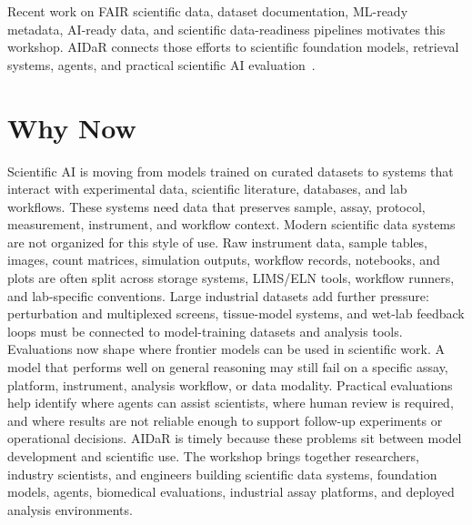 \documentclass[10pt]{article}
\begin{document}
Recent work on FAIR scientific data, dataset documentation, ML-ready metadata, AI-ready data, and scientific data-readiness pipelines motivates this workshop. AIDaR connects those efforts to scientific foundation models, retrieval systems, agents, and practical scientific AI evaluation~\cite{wilkinson2016fair,gebru2021datasheets,pushkarna2022datacards,akhtar2024croissant,brewer2025scientific,brewer2026pipeline,majithia2026actionable,hiniduma2024survey}.

\section{Why Now}
\label{sec:why-now}

Scientific AI is moving from models trained on curated datasets to systems that interact with experimental data, scientific literature, databases, and lab workflows. These systems need data that preserves sample, assay, protocol, measurement, instrument, and workflow context. Modern scientific data systems are not organized for this style of use. Raw instrument data, sample tables, images, count matrices, simulation outputs, workflow records, notebooks, and plots are often split across storage systems, LIMS/ELN tools, workflow runners, and lab-specific conventions. Large industrial datasets add further pressure: perturbation and multiplexed screens, tissue-model systems, and wet-lab feedback loops must be connected to model-training datasets and analysis tools. Evaluations now shape where frontier models can be used in scientific work. A model that performs well on general reasoning may still fail on a specific assay, platform, instrument, analysis workflow, or data modality. Practical evaluations help identify where agents can assist scientists, where human review is required, and where results are not reliable enough to support follow-up experiments or operational decisions. AIDaR is timely because these problems sit between model development and scientific use. The workshop brings together researchers, industry scientists, and engineers building scientific data systems, foundation models, agents, biomedical evaluations, industrial assay platforms, and deployed analysis environments.
\end{document}
